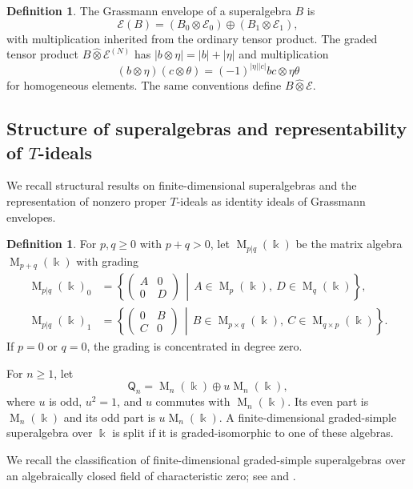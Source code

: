 \documentclass[11pt,reqno]{amsart}
\newcommand{\kk}{\Bbbk}
\newcommand{\E}{\mathcal E}
\newcommand{\Mat}{\operatorname{M}}
\newcommand{\Qtype}{\mathsf Q}
\theoremstyle{definition}
\newtheorem{definition}[theorem]{Definition}
\theoremstyle{remark}
\numberwithin{equation}{section}
\begin{document}
\begin{definition}\label{def:grassmann-envelope}
The Grassmann envelope of a superalgebra $B$ is
\[
\E(B)=(B_0\otimes\E_0)\oplus(B_1\otimes\E_1),
\]
with multiplication inherited from the ordinary tensor product.
The graded tensor product $B\mathbin{\widehat{\otimes}}\E^{(N)}$ has
$|b\otimes\eta|=|b|+|\eta|$ and multiplication
\[
(b\otimes\eta)(c\otimes\theta)
=(-1)^{|\eta||c|}bc\otimes\eta\theta
\]
for homogeneous elements. The same conventions define
$B\mathbin{\widehat{\otimes}}\E$. 
\end{definition}




\subsection{Structure of superalgebras and representability of
\texorpdfstring{$T$}{T}-ideals}
\label{subsec:graded-simple-structure}

We recall structural results on finite-dimensional superalgebras
and the representation of nonzero proper $T$-ideals as identity
ideals of Grassmann envelopes.


\begin{definition}\label{def:split-simple}
For $p,q\geq0$ with $p+q>0$, let $\Mat_{p|q}(\kk)$ be the
matrix algebra $\Mat_{p+q}(\kk)$ with grading
\[
\begin{aligned}
\Mat_{p|q}(\kk)_0
&=\left\{\begin{pmatrix}A&0\\0&D\end{pmatrix}
\,\middle|\,A\in\Mat_p(\kk),\ D\in\Mat_q(\kk)\right\},\\
\Mat_{p|q}(\kk)_1
&=\left\{\begin{pmatrix}0&B\\C&0\end{pmatrix}
\,\middle|\,B\in\Mat_{p\times q}(\kk),\
C\in\Mat_{q\times p}(\kk)\right\}.
\end{aligned}
\]
If $p=0$ or $q=0$, the grading is concentrated in degree zero.


For $n\geq1$, let
\[
\Qtype_n=\Mat_n(\kk)\oplus u\Mat_n(\kk),
\]
where $u$ is odd, $u^2=1$, and $u$ commutes with $\Mat_n(\kk)$.
Its even part is $\Mat_n(\kk)$ and its odd part is $u\Mat_n(\kk)$.
A finite-dimensional graded-simple superalgebra over $\kk$ is
split if it is graded-isomorphic to one of these algebras.
\end{definition}

We recall the classification of finite-dimensional graded-simple
superalgebras over an algebraically closed field of characteristic zero; see
\cite{AljadeffKanelBelov2010} and
\cite{GiambrunoZaicev2005}.
\end{document}

